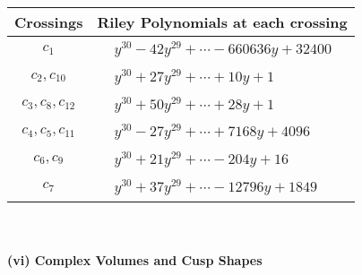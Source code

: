 \documentclass[1p]{elsarticle_modified}
\theoremstyle{definition}
\begin{document}
\begin{tabular}{m{50pt}|m{274pt}}
Crossings & \hspace{64pt}Riley Polynomials at each crossing \\
\hline $$\begin{aligned}c_{1}\end{aligned}$$&$\begin{aligned}
&y^{30}-42 y^{29}+\cdots-660636 y+32400
\end{aligned}$\\
\hline $$\begin{aligned}c_{2},c_{10}\end{aligned}$$&$\begin{aligned}
&y^{30}+27 y^{29}+\cdots+10 y+1
\end{aligned}$\\
\hline $$\begin{aligned}c_{3},c_{8},c_{12}\end{aligned}$$&$\begin{aligned}
&y^{30}+50 y^{29}+\cdots+28 y+1
\end{aligned}$\\
\hline $$\begin{aligned}c_{4},c_{5},c_{11}\end{aligned}$$&$\begin{aligned}
&y^{30}-27 y^{29}+\cdots+7168 y+4096
\end{aligned}$\\
\hline $$\begin{aligned}c_{6},c_{9}\end{aligned}$$&$\begin{aligned}
&y^{30}+21 y^{29}+\cdots-204 y+16
\end{aligned}$\\
\hline $$\begin{aligned}c_{7}\end{aligned}$$&$\begin{aligned}
&y^{30}+37 y^{29}+\cdots-12796 y+1849
\end{aligned}$\\
\hline
\end{tabular}\\~\\
\newpage\flushleft \textbf{(vi) Complex Volumes and Cusp Shapes}
\end{document}
